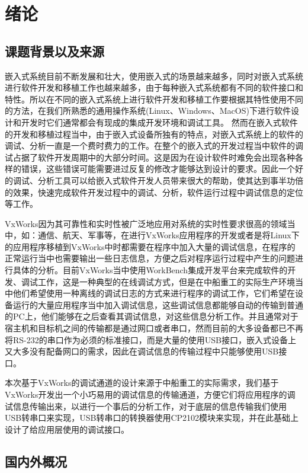\chapter{绪论}
\section{课题背景以及来源}
	嵌入式系统目前不断发展和壮大，使用嵌入式的场景越来越多，同时对嵌入式系统进行软件开发和移植工作也越来越多，由于每种嵌入式系统都有不同的软件接口和特性。所以在不同的嵌入式系统上进行软件开发和移植工作要根据其特性使用不同的方法，在我们所熟悉的通用操作系统(Linux、Windows、MacOS)下进行软件设计和开发时它们通常都会有现成的集成开发环境和调试工具。
	然而在嵌入式软件的开发和移植过程当中，由于嵌入式设备所独有的特点，对嵌入式系统上的软件的调试、分析一直是一个费时费力的工作。在整个的嵌入式的开发过程当中软件的调试占据了软件开发周期中的大部分时间。这是因为在设计软件时难免会出现各种各样的错误，这些错误可能需要进过反复的修改才能够达到设计的要求。因此一个好的调试、分析工具可以给嵌入式软件开发人员带来很大的帮助，使其达到事半功倍的效果，快速完成软件开发过程中的调试、分析，软件运行过程中调试信息的定位等工作。
	
	VxWorks因为其可靠性和实时性被广泛地应用对系统的实时性要求很高的领域当中，如：通信、航天、军事等\cite{刘小军2008基于}，在进行VxWorks应用程序的开发或者是将Linux下的应用程序移植到VxWorks中时都需要在程序中加入大量的调试信息，在程序的正常运行当中也需要输出一些日志信息，方便之后对程序运行过程中产生的问题进行具体的分析。目前VxWorks当中使用WorkBench集成开发平台来完成软件的开发、调试工作，这是一种典型的在线调试方式\cite{陈洋2007VxWorks}\cite{张鹏2007基于}，但是在中船重工的实际生产环境当中他们希望使用一种离线的调试日志的方式来进行程序的调试工作，它们希望在设备运行的大量应用程序当中加入调试信息，这些调试信息都能够自动的传输到普通的PC上，他们能够在之后查看其调试信息，对这些信息分析工作。并且通常对于宿主机和目标机之间的传输都是通过网口或者串口，然而目前的大多设备都已不再将RS-232的串口作为必须的标准接口，而是大量的使用USB接口，嵌入式设备上又大多没有配备网口的需求，因此在调试信息的传输过程中只能够使用USB接口。
	
	本次基于VxWorks的调试通道的设计来源于中船重工的实际需求，我们基于VxWorks开发出一个小巧易用的调试信息的传输通道，方便它们将应用程序的调试信息传输出来，以进行一个事后的分析工作，对于底层的信息传输我们使用USB转串口来实现，USB转串口的转换器使用CP2102模块来实现，并在此基础上设计了给应用层使用的调试接口。
	
			
\section{国内外概况}
	
